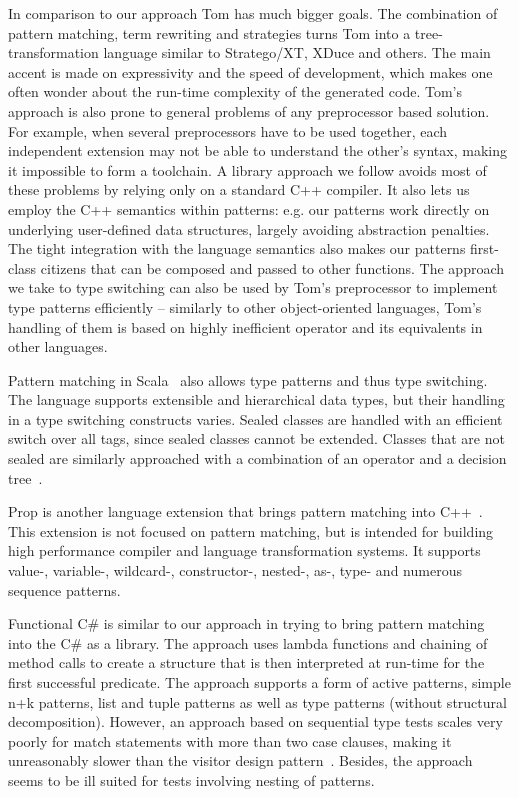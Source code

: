 In comparison to our approach Tom has much bigger goals. The combination of 
pattern matching, term rewriting and strategies turns Tom into a 
tree-transformation language similar to Stratego/XT, XDuce and others. 
The main accent is made on expressivity and the speed of development, which 
makes one often wonder about the run-time complexity of the generated code.
Tom's approach is also prone to general problems of any preprocessor based 
solution\cite[]{SELL}. For example, when several preprocessors 
have to be used together, each independent extension may not be able to 
understand the other's syntax, making it impossible to form a toolchain.
A library approach we follow avoids most of these problems by relying only on a 
standard C++ compiler. It also lets us employ the C++ semantics within 
patterns: e.g. our patterns work directly on underlying user-defined data 
structures, largely avoiding abstraction penalties. The tight integration with 
the language semantics also makes our patterns first-class citizens that can be 
composed and passed to other functions. The approach we take to type switching 
can also be used by Tom's preprocessor to implement type patterns efficiently -- 
similarly to other object-oriented languages, Tom's handling of them is based on 
highly inefficient  operator and its equivalents in other 
languages.

Pattern matching in Scala~\cite{Scala2nd} also allows type patterns and thus type 
switching. The language supports extensible and hierarchical data types, but 
their handling in a type switching constructs varies. Sealed classes are handled 
with an efficient switch over all tags, since sealed classes cannot be extended. 
Classes that are not sealed are similarly approached with a combination of an 
 operator and a decision tree~\cite{EmirThesis}.


Prop is another language extension that brings pattern matching into 
C++~\cite{Prop96}. This extension is not focused on pattern 
matching, but is intended for building high performance 
compiler and language transformation systems. It supports value-, variable-, 
wildcard-, constructor-, nested-, as-, type- and numerous sequence patterns.

Functional C\# is similar to our approach in trying to bring pattern matching 
into the C\# as a library\cite{FuncCSharp}. The approach uses lambda functions 
and chaining of method calls to create a structure that is then interpreted at 
run-time for the first successful predicate. The approach supports a form of 
active patterns, simple n+k patterns, list and tuple patterns as well as type 
patterns (without structural decomposition). 
However, an approach based on sequential type tests 
scales very poorly for match statements with more than two case clauses, making 
it unreasonably slower than the visitor design pattern~\cite{TypeSwitch}. Besides, the approach 
seems to be ill suited for tests involving nesting of patterns.

